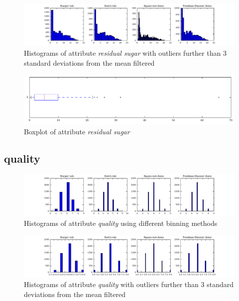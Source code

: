 \documentclass{report}
\begin{document}
\begin{figure}[H]
\includegraphics[width=\textwidth]{histograms/residual_sugar_filtered.pdf}
\caption{Histograms of attribute \emph{residual sugar} with outliers further than 3 standard deviations from the mean filtered}\n\end{figure}

\begin{figure}[H]
\includegraphics[width=\textwidth]{boxplots/residual_sugar.pdf}
\caption{Boxplot of attribute \emph{residual sugar}}\end{figure}

\newpage\subsection{quality}
\begin{figure}[H]
\includegraphics[width=\textwidth]{histograms/quality.pdf}
\caption{Histograms of attribute \emph{quality} using different binning methods}\end{figure}

\begin{figure}[H]
\includegraphics[width=\textwidth]{histograms/quality_filtered.pdf}
\caption{Histograms of attribute \emph{quality} with outliers further than 3 standard deviations from the mean filtered}\n\end{figure}
\end{document}
